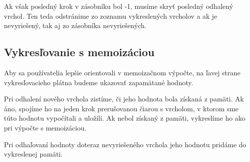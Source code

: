 Ak však posledný krok v zásobníku bol -1, musíme skryť posledný odhalený vrchol.
Ten teda odstránime zo zoznamu vykreslených vrcholov a ak je nevyriešený, tak aj
zo zásobníka nevyriešených.
\subsection{Vykresľovanie s memoizáciou}
Aby sa používatelia lepšie orientovali v memoizačnom výpočte, na ľavej strane
vykresľovacieho plátna budeme ukazovať zapamätané hodnoty.

Pri odhalení nového vrchola zistíme, či jeho hodnota bola získaná z pamäti.
Ak áno, spojíme ho na jeden krok prerušovanou
čiarou s vrcholom, v ktorom sme túto hodnotu vypočítali a uložili. Ak nebol získaný
z pamäti, vykreslíme ho ako pri výpočte s memoizáciou.

Pri odhaľovaní hodnoty doteraz nevyriešeného vrchola jeho hodnotu pridáme do vykreslenej pamäti.
